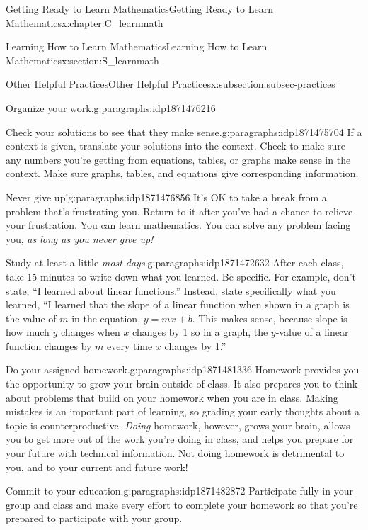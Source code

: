 \documentclass[oneside,10pt,]{book}
\numberwithin{equation}{chapter}
\begin{document}
\begin{chapterptx}{Getting Ready to Learn Mathematics}{}{Getting Ready to Learn Mathematics}{}{}{x:chapter:C_learnmath}
\begin{sectionptx}{Learning How to Learn Mathematics}{}{Learning How to Learn Mathematics}{}{}{x:section:S_learnmath}
\begin{subsectionptx}{Other Helpful Practices}{}{Other Helpful Practices}{}{}{x:subsection:subsec-practices}
\begin{paragraphs}{Organize your work.}{g:paragraphs:idp1871476216}
\end{paragraphs}%
\begin{paragraphs}{Check your solutions to see that they make sense.}{g:paragraphs:idp1871475704}%
If a context is given, translate your solutions into the context. Check to make sure any numbers you're getting from equations, tables, or graphs make sense in the context. Make sure graphs, tables, and equations give corresponding information.%
\end{paragraphs}%
\begin{paragraphs}{Never give up!}{g:paragraphs:idp1871476856}%
It's OK to take a break from a problem that's frustrating you. Return to it after you've had a chance to relieve your frustration. You can learn mathematics. You can solve any problem facing you, \emph{as long as you never give up!}%
\end{paragraphs}%
\begin{paragraphs}{Study at least a little \emph{most days}.}{g:paragraphs:idp1871472632}%
After each class, take 15 minutes to write down what you learned. Be specific. For example, don't state, ``I learned about linear functions.'' Instead, state specifically what you learned, ``I learned that the slope of a linear function when shown in a graph is the value of \(m\) in the equation, \(y = mx + b\). This makes sense, because slope is how much \(y\) changes when \(x\) changes by 1 so in a graph, the \(y\)-value of a linear function changes by \(m\) every time \(x\) changes by 1.''%
\end{paragraphs}%
\begin{paragraphs}{Do your assigned homework.}{g:paragraphs:idp1871481336}%
Homework provides you the opportunity to grow your brain outside of class. It also prepares you to think about problems that build on your homework when you are in class. Making mistakes is an important part of learning, so grading your early thoughts about a topic is counterproductive. \emph{Doing} homework, however, grows your brain, allows you to get more out of the work you're doing in class, and helps you prepare for your future with technical information. Not doing homework is detrimental to you, and to your current and future work!%
\end{paragraphs}%
\begin{paragraphs}{Commit to your education.}{g:paragraphs:idp1871482872}%
Participate fully in your group and class and make every effort to complete your homework so that you're prepared to participate with your group.%
\end{paragraphs}%

\end{subsectionptx}
\end{sectionptx}
\end{chapterptx}
\end{document}
